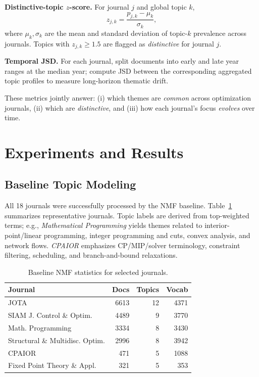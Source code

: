 \documentclass[conference]{IEEEtran}
\begin{document}
\textbf{Distinctive-topic $z$-score.} For journal $j$ and global topic $k$,
\begin{equation}
z_{j,k}=\frac{p_{j,k}-\mu_k}{\sigma_k},
\end{equation}
where $\mu_k,\sigma_k$ are the mean and standard deviation of topic-$k$ prevalence across journals.
Topics with $z_{j,k}\ge 1.5$ are flagged as \emph{distinctive} for journal $j$.

\textbf{Temporal JSD.} For each journal, split documents into early and late year ranges at the median year; compute JSD between the corresponding aggregated topic profiles to measure long-horizon thematic drift.

These metrics jointly answer: (i) which themes are \emph{common} across optimization journals, (ii) which are \emph{distinctive}, and (iii) how each journal's focus \emph{evolves} over time.

\section{Experiments and Results}
\label{sec:experiments}

\subsection{Baseline Topic Modeling}
All 18 journals were successfully processed by the NMF baseline.
Table~\ref{tab:summary} summarizes representative journals.
Topic labels are derived from top-weighted terms; e.g., \emph{Mathematical Programming} yields themes related to interior-point/linear programming, integer programming and cuts, convex analysis, and network flows.
\emph{CPAIOR} emphasizes CP/MIP/solver terminology, constraint filtering, scheduling, and branch-and-bound relaxations.

\begin{table}[t]
\centering
\caption{Baseline NMF statistics for selected journals.}
\label{tab:summary}
\small
\begin{tabular}{lrrr}
\toprule
Journal & Docs & Topics & Vocab \\
\midrule
JOTA & 6613 & 12 & 4371 \\
SIAM J. Control \& Optim. & 4489 & 9 & 3770 \\
Math. Programming & 3334 & 8 & 3430 \\
Structural \& Multidisc. Optim. & 2996 & 8 & 3942 \\
CPAIOR & 471 & 5 & 1088 \\
Fixed Point Theory \& Appl. & 321 & 5 & 353 \\
\bottomrule
\end{tabular}
\end{table}
\end{document}
